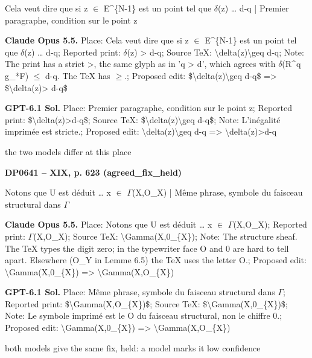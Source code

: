 Cela veut dire que si z \ensuremath{\in} E\textasciicircum{}\{N-1\} est un point tel que \ensuremath{\delta}(z) … d-q | Premier paragraphe, condition sur le point z\par
\textbf{Claude Opus 5.5.} Place: Cela veut dire que si z \ensuremath{\in} E\textasciicircum{}\{N-1\} est un point tel que \ensuremath{\delta}(z) … d-q; Reported print: \ensuremath{\delta}(z) > d-q; Source TeX: \textbackslash{}delta(z)\textbackslash{}geq d-q; Note: The print has a strict >, the same glyph as in 'q > d', which agrees with \ensuremath{\delta}(R\textasciicircum{}q g\_*F) \ensuremath{\leq} d-q. The TeX has \ensuremath{\geq}.; Proposed edit: \$\textbackslash{}delta(z)\textbackslash{}geq d-q\$ =\allowbreak > \$\textbackslash{}delta(z)> d-q\$\par
\textbf{GPT-6.1 Sol.} Place: Premier paragraphe, condition sur le point z; Reported print: \$\textbackslash{}delta(z)>d-q\$; Source TeX: \$\textbackslash{}delta(z)\textbackslash{}geq d-q\$; Note: L'inégalité imprimée est stricte.; Proposed edit: \textbackslash{}delta(z)\textbackslash{}geq d-q =\allowbreak > \textbackslash{}delta(z)>d-q\par
the two models differ at this place\par
\par\noindent\hypertarget{DP0641}{}\textbf{DP0641 -- XIX, p. 623 (agreed\_fix\_held)}\par
Notons que U est déduit … x \ensuremath{\in} \ensuremath{\Gamma}(X,O\_X) | Même phrase, symbole du faisceau structural dans \ensuremath{\Gamma}\par
\textbf{Claude Opus 5.5.} Place: Notons que U est déduit … x \ensuremath{\in} \ensuremath{\Gamma}(X,O\_X); Reported print: \ensuremath{\Gamma}(X,O\_X); Source TeX: \textbackslash{}Gamma(X,0\_\{X\}); Note: The structure sheaf. The TeX types the digit zero; in the typewriter face O and 0 are hard to tell apart. Elsewhere (O\_Y in Lemme 6.5) the TeX uses the letter O.; Proposed edit: \textbackslash{}Gamma(X,0\_\{X\}) =\allowbreak > \textbackslash{}Gamma(X,O\_\{X\})\par
\textbf{GPT-6.1 Sol.} Place: Même phrase, symbole du faisceau structural dans \ensuremath{\Gamma}; Reported print: \$\textbackslash{}Gamma(X,O\_\{X\})\$; Source TeX: \$\textbackslash{}Gamma(X,0\_\{X\})\$; Note: Le symbole imprimé est le O du faisceau structural, non le chiffre 0.; Proposed edit: \textbackslash{}Gamma(X,0\_\{X\}) =\allowbreak > \textbackslash{}Gamma(X,O\_\{X\})\par
both models give the same fix, held: a model marks it low confidence\par
